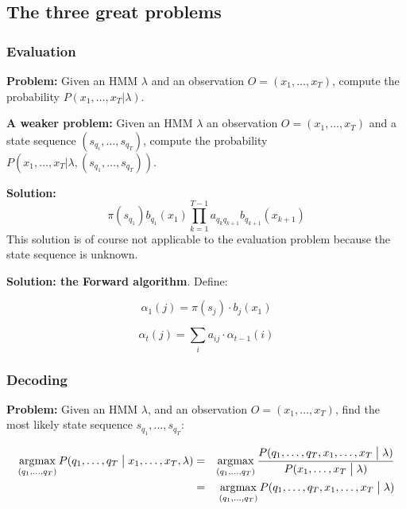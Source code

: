 \documentclass[11pt]{article}
\DeclareMathOperator*{\argmax}{\arg\!\max}
\begin{document}
\subsection{The three great problems}

\subsubsection{Evaluation}

\textbf{Problem:} Given an HMM $\lambda$ and an observation $O = (x_1, \ldots, x_T)$, compute the probability $P(x_1, \ldots, x_T | \lambda)$.

\vspace{10pt}

\textbf{A weaker problem:} Given an HMM $\lambda$ an observation $O = (x_1, \ldots, x_T)$ and a state sequence $(s_{q_i}, \ldots, s_{q_T})$, compute the probability $P(x_1, \ldots, x_T | \lambda, (s_{q_1}, \ldots, s_{q_T}))$.

\vspace{5pt}

\textbf{Solution:}
\begin{equation}
    \pi(s_{q_1}) b_{q_1}(x_1) \prod\limits_{k = 1}^{T - 1} a_{q_{k}q_{k+1}} b_{q_{k+1}}(x_{k+1})
\end{equation}
This solution is of course not applicable to the evaluation problem because the state sequence is unknown.

\vspace{10pt}

\textbf{Solution: the Forward algorithm}. Define:

\begin{equation}
    \alpha_1(j) = \pi(s_j) \cdot b_j(x_1)
\end{equation}

\begin{equation}
    \alpha_t(j) = \sum\limits_i a_{ij} \cdot \alpha_{t-1}(i)
\end{equation}

\subsubsection{Decoding}

\textbf{Problem:} Given an HMM $\lambda$, and an observation $O = (x_1, \ldots, x_T)$, find the most likely state sequence $s_{q_1}, \ldots, s_{q_T}$:

\begin{eqnarray*}
    \argmax_{(q_1, \ldots, q_T)} P(q_1, \ldots, q_T \bigm| x_1, \ldots, x_T, \lambda)
    &=& \argmax_{(q_1, \ldots, q_T)} \frac{P(q_1, \ldots, q_T, x_1, \ldots, x_T \bigm| \lambda)}{P(x_1, \ldots, x_T \bigm| \lambda)} \\
    &=& \argmax_{(q_1, \ldots, q_T)} P(q_1, \ldots, q_T, x_1, \ldots, x_T \bigm| \lambda)
\end{eqnarray*}
\end{document}
